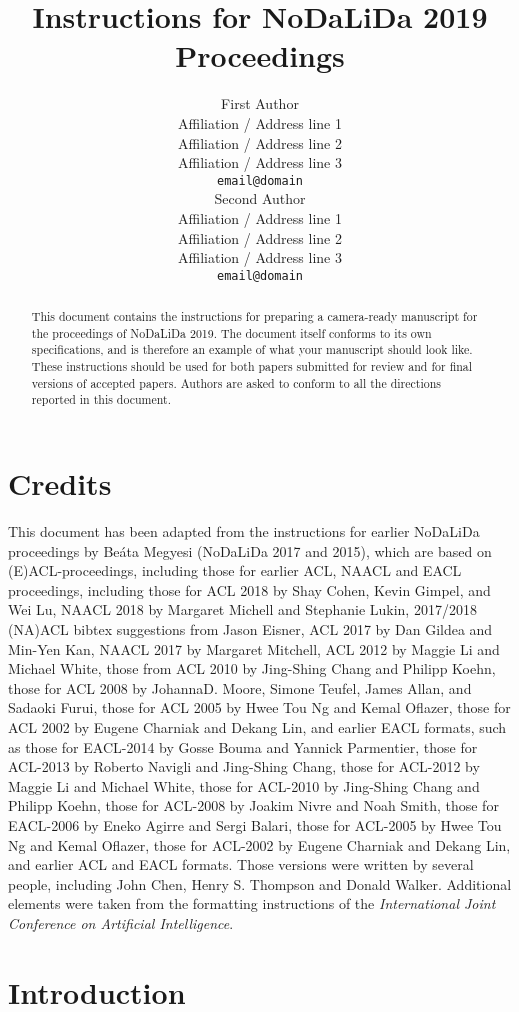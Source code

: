 \documentclass[11pt]{article}
\title{Instructions for NoDaLiDa 2019 Proceedings}
\author{First Author \\
  Affiliation / Address line 1 \\
  Affiliation / Address line 2 \\
  Affiliation / Address line 3 \\
  {\tt email@domain} \\\And
  Second Author \\
  Affiliation / Address line 1 \\
  Affiliation / Address line 2 \\
  Affiliation / Address line 3 \\
  {\tt email@domain} \\}
\date{}
\begin{document}
\maketitle
\begin{abstract}
  This document contains the instructions for preparing a camera-ready
  manuscript for the proceedings of NoDaLiDa 2019. The document itself
  conforms to its own specifications, and is therefore an example of
  what your manuscript should look like. These instructions should be
  used for both papers submitted for review and for final versions of
  accepted papers.  Authors are asked to conform to all the directions
  reported in this document.
\end{abstract}

\section{Credits}

This document has been adapted from the instructions for earlier
NoDaLiDa proceedings by Be\'{a}ta Megyesi (NoDaLiDa 2017 and 2015), which are
based on (E)ACL-proceedings, including those for earlier ACL, NAACL and EACL proceedings,
including 
those for ACL 2018 by Shay Cohen, Kevin Gimpel, and Wei Lu, 
NAACL 2018 by Margaret Michell and Stephanie Lukin,
2017/2018 (NA)ACL bibtex suggestions from Jason Eisner,
ACL 2017 by Dan Gildea and Min-Yen Kan, 
NAACL 2017 by Margaret Mitchell, 
ACL 2012 by Maggie Li and Michael White, 
those from ACL 2010 by Jing-Shing Chang and Philipp Koehn, 
those for ACL 2008 by JohannaD. Moore, Simone Teufel, James Allan, and Sadaoki Furui, 
those for ACL 2005 by Hwee Tou Ng and Kemal Oflazer, 
those for ACL 2002 by Eugene Charniak and Dekang Lin, 
and earlier EACL formats, such as those for
EACL-2014 by Gosse Bouma
and Yannick Parmentier, those for ACL-2013 by Roberto Navigli
and Jing-Shing Chang, those for ACL-2012 by Maggie Li and Michael
White, those for ACL-2010 by Jing-Shing Chang and Philipp Koehn,
those for ACL-2008 by Joakim Nivre and Noah Smith, 
those for EACL-2006 by Eneko Agirre and Sergi Balari, 
those for ACL-2005 by Hwee Tou Ng and Kemal Oflazer, those for
ACL-2002 by Eugene Charniak and Dekang Lin, and earlier ACL and EACL
formats. Those versions were written by several people, including John
Chen, Henry S. Thompson and Donald Walker. Additional elements were
taken from the formatting instructions of the {\em International Joint
  Conference on Artificial Intelligence}.

\section{Introduction}
\end{document}
